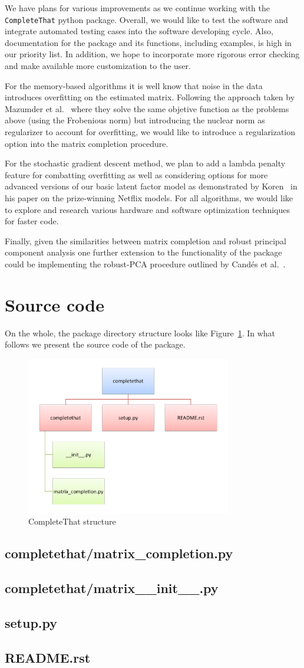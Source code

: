 \documentclass[12pt]{article}
\newcommand{\code}[2] {
  \hrulefill
  \subsection*{#1}
  
  \vspace{2em}
}
\begin{document}
We have plans for various improvements as we continue working with the \texttt{CompleteThat} python package. Overall, we would like to test the software and integrate automated testing cases into the software developing cycle. Also, documentation for the package and its functions, including examples, is high in our priority list. In addition, we hope to incorporate more rigorous error checking and make   available more customization to the user. 

For the memory-based algorithms it is well know that noise in the data introduces overfitting on the estimated matrix. Following the approach taken by Mazumder et al.~\cite{mazumder:2010}  where they solve the same objetive function as the problems above (using the Frobenious norm) but introducing the nuclear norm as regularizer to account for overfitting, we would like to introduce a regularization option into the matrix completion procedure. 

For the stochastic gradient descent method, we plan to add a lambda penalty feature for combatting overfitting as well as considering options for more advanced versions of our basic latent factor model as demonstrated by Koren~\cite{koren:2008} in his paper on the prize-winning Netflix models. 
For all algorithms, we would like to explore and research various hardware and software optimization techniques for faster code. 

Finally, given the similarities between matrix completion and robust principal component analysis one further extension to the functionality of the package could be implementing the robust-PCA procedure outlined by Cand\'es et al.~\cite{candes:2011}.

\newpage



\newpage
\section{Source code}
On the whole, the package directory structure looks like Figure~\ref{fig:code_scheme}. In what follows we present the source code of the package.
\begin{figure}[h!]
  \centering
    \includegraphics[width=0.8\textwidth]{./figures/code_scheme.pdf}
    \caption{CompleteThat structure}
    \label{fig:code_scheme}
\end{figure}

\code{completethat/matrix\_completion.py}{../code/completethat/matrix_completion.py}
\code{completethat/matrix\_\_init\_\_.py}{../code/completethat/__init__.py}
\code{setup.py}{../code/setup.py}
\hrulefill
\subsection*{README.rst}

\end{document}
